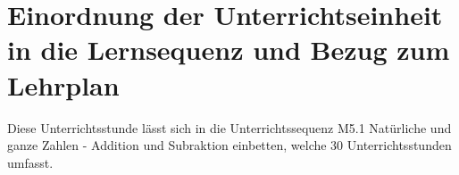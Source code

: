 \chapter{Einordnung der Unterrichtseinheit in die Lernsequenz und Bezug zum Lehrplan}
Diese Unterrichtsstunde lässt sich in die Unterrichtssequenz M5.1 Natürliche und ganze Zahlen - Addition und Subraktion einbetten, welche 30 Unterrichtsstunden umfasst. 